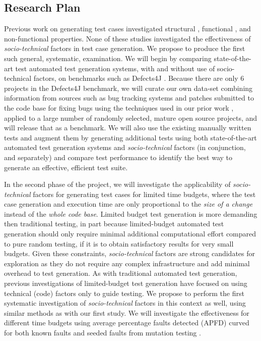 \documentclass[10pt]{article}
\begin{document}
\subsection{Research Plan}

 Previous work on generating test cases investigated structural \cite{tonella2004evolutionary}, functional \cite{wegener2004evaluation}, and non-functional \cite{wegener1998verifying} properties. %
None of these studies investigated the effectiveness of \emph{socio-technical} factors in test case generation. We propose to produce the first such general, systematic, examination. We will begin by comparing state-of-the-art test automated test generation systems, with and without use of socio-technical factors, on benchmarks such as Defects4J \cite{just2014defects4j}.  Because there are only 6 projects in the Defects4J benchmark, we will curate our own data-set combining information from  sources such as bug tracking systems and patches submitted to the code base for fixing bugs using the techniques used in our prior work \cite{ahmed2016can}, applied to a large number of randomly selected, mature open source projects, and will release that as a benchmark.  We will also use the existing manually written tests and augment them by generating additional tests using both state-of-the-art automated test generation systems and \emph{socio-technical} factors (in conjunction, and separately) and compare test performance to identify the best way to generate an effective, efficient test suite.

 In the second phase of the project, we will investigate the applicability of \emph{socio-technical} factors for generating test cases for limited time budgets, where the test case generation and execution time are only proportional to the \emph{size of a change} instead of the \emph{whole code base}. Limited budget test generation is more demanding then traditional testing, in part because limited-budget automated test generation should only require minimal additional computational effort compared to pure random testing, if it is to obtain satisfactory results for very small budgets. Given these constraints, \emph{socio-technical} factors are strong candidates for exploration as they do not require any complex infrastructure and add minimal overhead to test generation.  As with traditional automated test generation, previous investigations of limited-budget test generation \cite{groce2012lightweight} have focused on using technical (code) factors only to guide testing. We propose to perform the first systematic investigation of \emph{socio-technical} factors in this context as well, using similar methods as with our first study.  
We will investigate the effectiveness for different time budgets using average percentage faults detected (APFD) \cite{elbaum2002test} curved for both known faults and seeded faults from mutation testing \cite{ahmed2017applying}.
\end{document}
